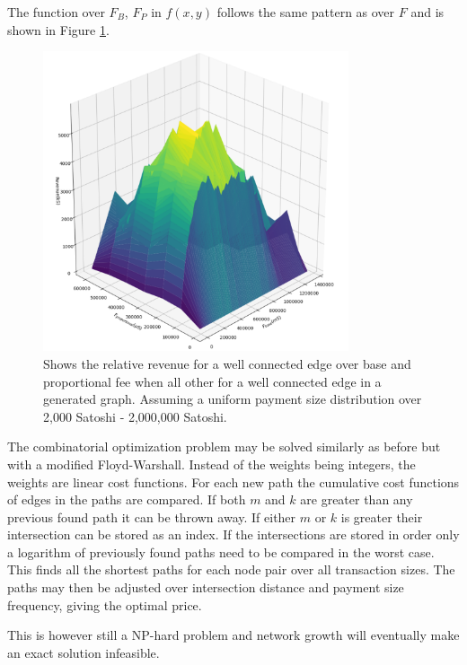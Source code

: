 The function over $F_B$, $F_P$ in $f(x,y)$ follows the same pattern as over $F$ and is shown in Figure \ref{fig:cost:function:space}.

\begin{figure}[!htb]
	\vspace*{-0.0cm}
	\hspace*{0cm} 
	\centering
	\includegraphics[width=9cm]{plots/price.png}
	\caption{Shows the relative revenue for a well connected edge over base and proportional fee when all other for a well connected edge in a generated graph. Assuming a uniform payment size distribution over 2,000 Satoshi - 2,000,000 Satoshi. }
	\label{fig:cost:function:space}
	\hspace*{2mm} 
\end{figure}

The combinatorial optimization problem may be solved similarly as before but with a modified Floyd-Warshall. Instead of the weights being integers, the weights are linear cost functions. For each new path the cumulative cost functions of edges in the paths are compared. If both $m$ and $k$ are greater than any previous found path it can be thrown away. If either $m$ or $k$ is greater their intersection can be stored as an index. If the intersections are stored in order only a logarithm of previously found paths need to be compared in the worst case. This finds all the shortest paths for each node pair over all transaction sizes. The paths may then be adjusted over intersection distance and payment size frequency, giving the optimal price.

This is however still a NP-hard problem and network growth will eventually make an exact solution infeasible. 

